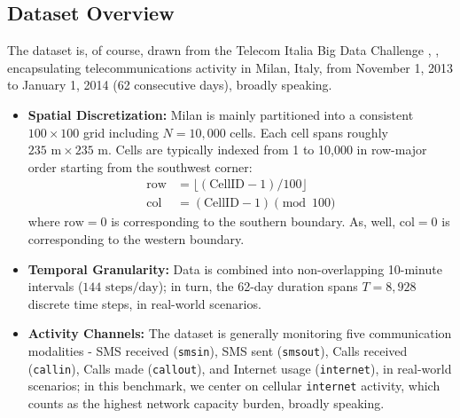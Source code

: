 \documentclass[conference]{IEEEtran}
\begin{document}
\subsection{Dataset Overview}
The dataset is, of course, drawn from the Telecom Italia Big Data Challenge \cite{b11}, \cite{b12}, encapsulating telecommunications activity in Milan, Italy, from November 1, 2013 to January 1, 2014 (62 consecutive days), broadly speaking. 
\begin{itemize}
    \item \textbf{Spatial Discretization:} Milan is mainly partitioned into a consistent $100 \times 100$ grid including $N = 10,000$ cells. Each cell spans roughly $235\text{ m} \times 235\text{ m}$. Cells are typically indexed from 1 to 10,000 in row-major order starting from the southwest corner:
    \begin{align}
        \text{row} &= \lfloor (\text{CellID} - 1) / 100 \rfloor \\
        \text{col} &= (\text{CellID} - 1) \pmod{100}
    \end{align}
    where $\text{row} = 0$ is corresponding to the southern boundary. As, well, $\text{col} = 0$ is corresponding to the western boundary.
    \item \textbf{Temporal Granularity:} Data is combined into non-overlapping 10-minute intervals ($144\text{ steps/day}$); in turn, the 62-day duration spans $T = 8,928$ discrete time steps, in real-world scenarios.
    \item \textbf{Activity Channels:} The dataset is generally monitoring five communication modalities - SMS received (\texttt{smsin}), SMS sent (\texttt{smsout}), Calls received (\texttt{callin}), Calls made (\texttt{callout}), and Internet usage (\texttt{internet}), in real-world scenarios; in this benchmark, we center on cellular \texttt{internet} activity, which counts as the highest network capacity burden, broadly speaking.
\end{itemize}
\end{document}
